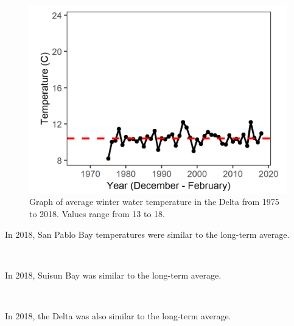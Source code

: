 \documentclass[
]{book}
\begin{document}
\begin{panel-grid}
\begin{columns-nocenter}
\begin{column800}
\begin{expand}
\begin{figure}
\includegraphics[width=15.25in]{figures/temp_dtwinter} \caption{Graph of average winter water temperature in the Delta from 1975 to 2018. Values range from 13 to 18.}\label{fig:unnamed-chunk-154}
\end{figure}

\end{expand}

\end{column800}

\end{columns-nocenter}

\begin{columns-nocenter}

\begin{column800}

In 2018, San Pablo Bay temperatures were similar to the long-term average.

\end{column800}

\begin{column40}

~

\end{column40}

\begin{column800}

In 2018, Suisun Bay was similar to the long-term average.

\end{column800}

\begin{column40}

~

\end{column40}

\begin{column800}

In 2018, the Delta was also similar to the long-term average.

\end{column800}

\end{columns-nocenter}

\end{panel-grid}
\end{document}
